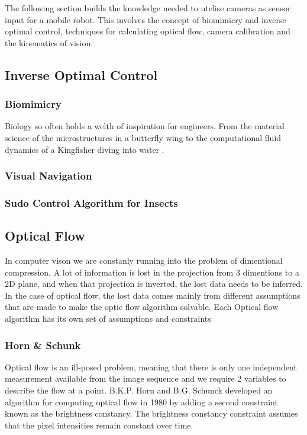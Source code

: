 \documentclass{UoNMCHA}
\numberwithin{equation}{section}
\begin{document}
The following section builds the knowledge needed to utelise cameras as sensor input for a mobile robot. This involves the concept of biomimicry and inverse optimal control, techniques for calculating optical flow, camera calibration and the kinematics of vision.

\subsection{Inverse Optimal Control} %

\subsubsection{Biomimicry} %
Biology so often holds a welth of inspiration for engineers. From the material science of the microstructures in a butterfly wing to the computational fluid dynamics of a Kingfisher diving into water \citep{benyus1997biomimicry}.
\subsubsection{Visual Navigation}
\subsubsection{Sudo Control Algorithm for Insects}
\subsubsection{}
\subsection{Optical Flow} %
In computer vison we are constanly running into the problem of dimentional compression. A lot of information is lost in the projection from 3 dimentions to a 2D plane, and when that projection is inverted, the lost data needs to be inferred. In the case of optical flow, the lost data comes mainly from different assumptions that are made to make the optic flow algorithm solvable. Each Optical flow algorithm has its own set of assumptions and constraints
\subsubsection{Horn \& Schunk} %
Optical flow is an ill-posed problem, meaning that there is only one independent measurement available from the image sequence and we require 2 variables to describe the flow at a point. B.K.P. Horn and B.G. Schunck developed an algorithm for computing optical flow in 1980 \citep{horn1981determining} by adding a second constraint known as the brightness constancy. The brightness constancy constraint assumes that the pixel intensities remain constant over time.
\end{document}
